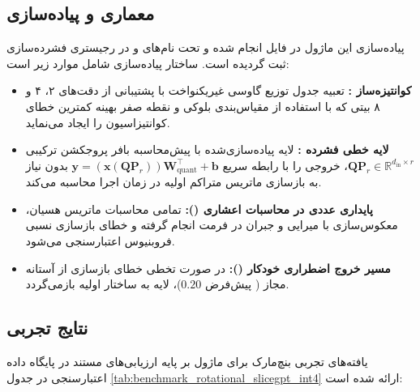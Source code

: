 \subsection{معماری و پیاده‌سازی}
پیاده‌سازی این ماژول در فایل  انجام شده و تحت نام‌های  و  در رجیستری فشرده‌سازی ثبت گردیده است. ساختار پیاده‌سازی شامل موارد زیر است:
\begin{itemize}
    \item \textbf{کوانتیزه‌ساز :} تعبیه جدول توزیع گاوسی غیریکنواخت با پشتیبانی از دقت‌های ۲، ۴ و ۸ بیتی که با استفاده از مقیاس‌بندی بلوکی و نقطه صفر بهینه کمترین خطای کوانتیزاسیون را ایجاد می‌نماید.
    \item \textbf{لایه خطی فشرده :} لایه پیاده‌سازی‌شده با پیش‌محاسبه بافر پروجکشن ترکیبی $\mathbf{Q} \mathbf{P}_r \in \mathbb{R}^{d_{\text{in}} \times r}$، خروجی را با رابطه سریع $\mathbf{y} = (\mathbf{x} (\mathbf{Q} \mathbf{P}_r)) \mathbf{W}_{\text{quant}}^\top + \mathbf{b}$ بدون نیاز به بازسازی ماتریس متراکم اولیه در زمان اجرا محاسبه می‌کند.
    \item \textbf{پایداری عددی در محاسبات اعشاری ():} تمامی محاسبات ماتریس هسیان، معکوس‌سازی با میرایی و جبران  در فرمت  انجام گرفته و خطای بازسازی نسبی فروبنیوس اعتبارسنجی می‌شود.
    \item \textbf{مسیر خروج اضطراری خودکار ():} در صورت تخطی خطای بازسازی از آستانه مجاز ( پیش‌فرض $0.20$)، لایه به ساختار اولیه بازمی‌گردد.
\end{itemize}

\subsection{نتایج تجربی}
یافته‌های تجربی بنچ‌مارک برای ماژول  بر پایه ارزیابی‌های مستند در پایگاه داده اعتبارسنجی  در جدول \ref{tab:benchmark_rotational_slicegpt_int4} ارائه شده است:

